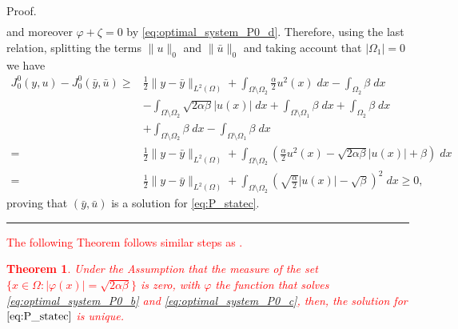 \documentclass[11pt,a4paper]{amsart}
\newcommand{\kw}{\rule{2mm}{2mm}}
\renewcommand{\l}{\left}
\renewcommand{\r}{\right}
\newcommand{\om}{\Omega}
\renewenvironment{proof}{{Proof.}}{\hfill\kw}
\newtheorem{theorem}{{Theorem}}
\newcommand{\norm}[1]{\lVert #1 \rVert}
\begin{document}
{\begin{proof}
\[\begin{aligned}
    \end{aligned}
    \]
    and moreover $\varphi+\zeta=0$ by \eqref{eq:optimal_system_P0_d}. Therefore, using the last relation, splitting the terms $\norm{u}_0$ and $\norm{\bar u}_0$ and taking account that $|\om_1|=0$ we have
    \[
    \begin{aligned}
        J_0^0(y,u)-J_0^0(\bar y, \bar u)\ge& \frac{1}{2}\norm{y-\bar y}_{L^2(\om)}      +\int_{\om\setminus\om_2}\frac{\alpha}{2}u^2(x)\; dx-\int_{\om_2}\beta\; dx\\
        &-\int_{\om\setminus\om_2}\sqrt{2\alpha\beta}|u(x)|\; dx +\int_{\om\setminus\om_1}\beta\; dx+\int_{\om_2}\beta\; dx\\
        &+\int_{\om\setminus \om_2}\beta\; dx-\int_{\om\setminus\om_1}\beta\; dx\\
        =& \frac{1}{2}\norm{y-\bar y}_{L^2(\om)}+\int_{\om\setminus\om_2}\l(\frac{\alpha}{2}u^2(x)-\sqrt{2\alpha\beta}|u(x)|+\beta\r)\; dx\\
        =&\frac{1}{2}\norm{y-\bar y}_{L^2(\om)}+\int_{\om\setminus\om_2}\l(\sqrt{\frac{\alpha}{2}}|u(x)|-\sqrt{\beta}\r)^2\; dx\ge 0,
    \end{aligned}
    \]
    proving that $(\bar y, \bar u)$ is a solution for \eqref{eq:P_statec}.
\end{proof}}

\textcolor{red}{The following Theorem follows similar steps as \cite[Theorem 2.11 ]{itokun2014}. 
\begin{theorem}\label{th:4}
    Under the Assumption that the measure of the set $\{x\in\om: |\varphi(x)|=\sqrt{2\alpha\beta}\}$ is zero, with $\varphi$ the function that solves \eqref{eq:optimal_system_P0_b} and \eqref{eq:optimal_system_P0_c}, then, the solution for $\eqref{eq:P_statec}$ is unique. 
\end{theorem}}
\end{document}
